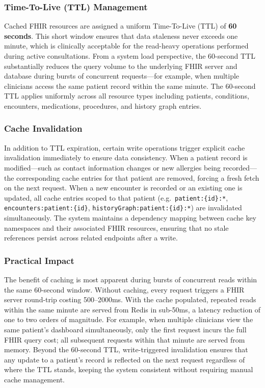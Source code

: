 \subsubsection{Time-To-Live (TTL) Management}
Cached FHIR resources are assigned a uniform Time-To-Live (TTL) of
\textbf{60 seconds}. This short window ensures that data staleness never
exceeds one minute, which is clinically acceptable for the read-heavy
operations performed during active consultations. From a system load
perspective, the 60-second TTL substantially reduces the query volume to the
underlying FHIR server and database during bursts of concurrent requests---for
example, when multiple clinicians access the same patient record within the
same minute. The 60-second TTL applies uniformly across all resource types
including patients, conditions, encounters, medications, procedures, and
history graph entries.

\subsubsection{Cache Invalidation}
In addition to TTL expiration, certain write operations trigger explicit cache
invalidation immediately to ensure data consistency. When a patient record is
modified---such as contact information changes or new allergies being
recorded---the corresponding cache entries for that patient are removed,
forcing a fresh fetch on the next request. When a new encounter is recorded or
an existing one is updated, all cache entries scoped to that patient
(e.g.\ \texttt{patient:\{id\}:*}, \texttt{encounters:patient:\{id\}},
\texttt{historyGraph:patient:\{id\}:*}) are invalidated simultaneously. The
system maintains a dependency mapping between cache key namespaces and their
associated FHIR resources, ensuring that no stale references persist across
related endpoints after a write.

\subsubsection{Practical Impact}
The benefit of caching is most apparent during bursts of concurrent reads
within the same 60-second window. Without caching, every request triggers a
FHIR server round-trip costing 500--2000ms. With the cache populated, repeated
reads within the same minute are served from Redis in sub-50ms, a latency
reduction of one to two orders of magnitude. For example, when multiple
clinicians view the same patient's dashboard simultaneously, only the first
request incurs the full FHIR query cost; all subsequent requests within that
minute are served from memory. Beyond the 60-second TTL, write-triggered
invalidation ensures that any update to a patient's record is reflected on the
next request regardless of where the TTL stands, keeping the system consistent
without requiring manual cache management.

